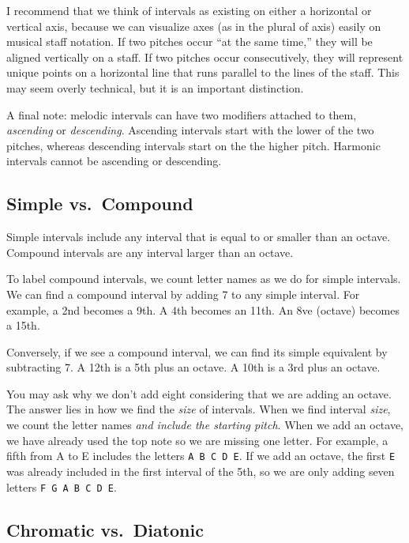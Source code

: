 \documentclass{book}
\begin{document}
I recommend that we think of intervals as existing on either a horizontal or
vertical axis, because we can visualize axes (as in the plural of axis) easily
on musical staff notation. If two pitches occur ``at the same time,'' they
will be aligned vertically on a staff. If two pitches occur consecutively,
they will represent unique points on a horizontal line that runs parallel to
the lines of the staff. This may seem overly technical, but it is an important
distinction.

A final note: melodic intervals can have two modifiers attached to them,
\emph{ascending} or \emph{descending}. Ascending intervals start with the
lower of the two pitches, whereas descending intervals start on the the higher
pitch. Harmonic intervals cannot be ascending or descending.

\hypertarget{simple-vs.-compound}{%
\subsection{Simple vs.~Compound}\label{simple-vs.-compound}}

Simple intervals include any interval that is equal to or smaller than an
octave. Compound intervals are any interval larger than an octave.

To label compound intervals, we count letter names as we do for simple
intervals. We can find a compound interval by adding 7 to any simple interval.
For example, a 2nd becomes a 9th. A 4th becomes an 11th. An 8ve (octave)
becomes a 15th.

Conversely, if we see a compound interval, we can find its simple equivalent
by subtracting 7. A 12th is a 5th plus an octave. A 10th is a 3rd plus an
octave.

You may ask why we don't add eight considering that we are adding an octave.
The answer lies in how we find the \emph{size} of intervals. When we find
interval \emph{size}, we count the letter names \emph{and include the starting
pitch}. When we add an octave, we have already used the top note so we are
missing one letter. For example, a fifth from A to E includes the letters
\texttt{A\ B\ C\ D\ E}. If we add an octave, the first \texttt{E} was already
included in the first interval of the 5th, so we are only adding seven letters
\texttt{F\ G\ A\ B\ C\ D\ E}.

\hypertarget{chromatic-vs.-diatonic}{%
\subsection{Chromatic vs.~Diatonic}\label{chromatic-vs.-diatonic}}
\end{document}

